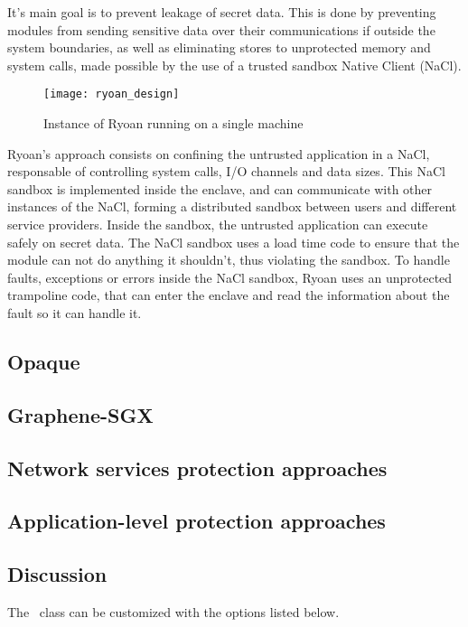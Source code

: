 It's main goal is to prevent leakage of secret data. This is done by preventing modules from sending sensitive data over their communications if outside the system boundaries, as well as eliminating stores to unprotected memory and system calls, made possible by the use of a trusted sandbox Native Client (NaCl). 

\begin{figure}[htbp]
	\centering
	{\texttt{[image: ryoan\_design]}}%
	\caption{Instance of Ryoan running on a single machine}
\end{figure}

Ryoan's approach consists on confining the untrusted application in a NaCl, responsable of controlling system calls, I/O channels and data sizes. This NaCl sandbox is implemented inside the enclave, and can communicate with other instances of the NaCl, forming a distributed sandbox between users and different service providers. Inside the sandbox, the untrusted application can execute safely on secret data. The NaCl sandbox uses a load time code to ensure that the module can not do anything it shouldn't, thus violating the sandbox. To handle faults, exceptions or errors inside the NaCl sandbox, Ryoan uses an unprotected trampoline code, that can enter the enclave and read the information about the fault so it can handle it.



\subsection{Opaque}
\subsection{Graphene-SGX}
\subsection{Network services protection approaches}
\subsection{Application-level protection approaches}
\subsection{Discussion}


The \novathesis\ class can be customized with the options listed below.

\newcommand{\classoption}[3]{\textbf{#1=OPT}\qquad #2\\\qquad\emph{#3}\\}


